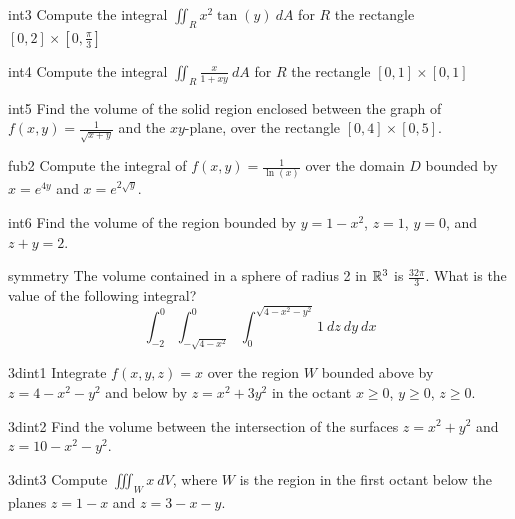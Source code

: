 \begin{problem}{int3}
    Compute the integral $\iint_R x^2\tan(y) \ dA$ for $R$ the rectangle $[0,2] \times [0, \frac{\pi}{3}]$
\end{problem}

\begin{problem}{int4}
    Compute the integral $\iint_R \frac{x}{1+xy} \ dA$ for $R$ the rectangle $[0,1] \times [0, 1]$
\end{problem}

\begin{problem}{int5}
    Find the volume of the solid region enclosed between the graph of  $f(x,y) = \frac{1}{\sqrt{x+y}}$ and the $xy$-plane, over the rectangle $[0,4] \times [0,5]$.	
\end{problem}

\begin{problem}{fub2}
    Compute the integral of $f(x,y) = \frac{1}{\ln(x)}$ over the domain $D$ bounded by $x = e^{4y}$ and $x= e^{2\sqrt{y}}$.
\end{problem}

\begin{problem}{int6}
    Find the volume of the region bounded by $y = 1-x^2$, $z = 1$, $y = 0$, and $z+y=2$.
\end{problem}

\begin{problem}{symmetry}
    The volume contained in a sphere of radius 2 in $\mathbb{R}^3$ is $\frac{32\pi}{3}$.  What is the value of the following integral?  $$\int_{-2}^0\int^{0}_{-\sqrt{4-x^2}}\int_{0}^{\sqrt{4-x^2-y^2}} 1 \ dz \ dy \ dx$$
    
\end{problem}

\begin{problem}{3dint1}
    Integrate $f(x,y,z) = x$ over the region $W$ bounded above by $z = 4-x^2-y^2$ and below by $z=x^2+3y^2$ in the octant $x \geq 0$, $y \geq 0$, $z \geq 0$.
\end{problem}

\begin{problem}{3dint2}
    Find the volume between the intersection of the surfaces $z = x^2 + y^2$ and $z = 10 - x^2 - y^2$.
\end{problem}

\begin{problem}{3dint3}
    Compute $\iiint_W x \ dV$, where $W$ is the region in the first octant below the planes $z = 1-x$ and $z = 3 - x- y$.
\end{problem}










